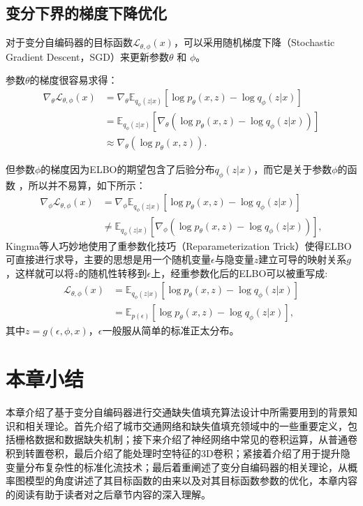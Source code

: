 \subsection{变分下界的梯度下降优化}
对于变分自编码器的目标函数$\mathcal{L}_{\theta, \phi}(x)$，可以采用随机梯度下降（Stochastic Gradient Descent，SGD）来更新参数$\theta$ 和 $\phi$。

参数$\theta$的梯度很容易求得：
\begin{equation}
	\begin{split}
		\nabla_{\theta}\mathcal{L}_{\theta, \phi}(x) &= \nabla_{\theta} \mathbb{E}_{q_{\phi}(z|x)}[\log{p_{\theta}(x, z)} - \log{{q_{\phi}(z|x)}}] \\
		&= \mathbb{E}_{q_{\phi}(z|x)}[\nabla_{\theta}(\log{p_{\theta}(x, z)} - \log{{q_{\phi}(z|x)}})] \\
		&\approx \nabla_{\theta}(\log{p_{\theta}(x, z)}).
	\end{split}
\end{equation}

但参数$\phi$的梯度因为ELBO的期望包含了后验分布$q_{\phi}(z|x)$，而它是关于参数$\phi$的函数 ，所以并不易算，如下所示：
\begin{equation}
	\begin{split}
		\nabla_{\phi}\mathcal{L}_{\theta, \phi}(x) &= \nabla_{\phi} \mathbb{E}_{q_{\phi}(z|x)}[\log{p_{\theta}(x, z)} - \log{{q_{\phi}(z|x)}}] \\
		&\neq \mathbb{E}_{q_{\phi}(z|x)}[\nabla_{\phi}(\log{p_{\theta}(x, z)} - \log{{q_{\phi}(z|x)}})],
	\end{split}
\end{equation}
Kingma\cite{kingma2013auto}等人巧妙地使用了重参数化技巧（Reparameterization Trick）使得ELBO可直接进行求导，主要的思想是用一个随机变量$\epsilon$与隐变量$z$建立可导的映射关系$g$，这样就可以将$z$的随机性转移到$\epsilon$上，经重参数化后的ELBO可以被重写成:
\begin{equation}
	\begin{split}
		\mathcal{L}_{\theta, \phi}(x) &= \mathbb{E}_{q_{\phi}(z|x)}[\log{p_{\theta}(x, z)} - \log{{q_{\phi}(z|x)}}] \\
		&= \mathbb{E}_{p(\epsilon)}[\log{p_{\theta}(x, z)} - \log{{q_{\phi}(z|x)}}],
	\end{split}
\end{equation}
其中$z=g(\epsilon, \phi, x)$，$\epsilon$一般服从简单的标准正太分布。

\section{本章小结}
本章介绍了基于变分自编码器进行交通缺失值填充算法设计中所需要用到的背景知识和相关理论。首先介绍了城市交通网络和缺失值填充领域中的一些重要定义，包括栅格数据和数据缺失机制；接下来介绍了神经网络中常见的卷积运算，从普通卷积到转置卷积，最后介绍了能处理时空特征的3D卷积；紧接着介绍了用于提升隐变量分布复杂性的标准化流技术；最后着重阐述了变分自编码器的相关理论，从概率图模型的角度讲述了其目标函数的由来以及对其目标函数参数的优化，本章内容的阅读有助于读者对之后章节内容的深入理解。


